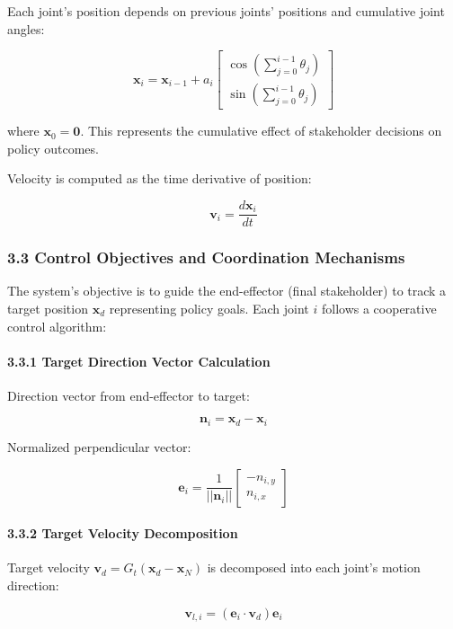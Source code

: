 Each joint's position depends on previous joints' positions and
cumulative joint angles:

\[\mathbf{x}_i = \mathbf{x}_{i-1} + a_i \begin{bmatrix} \cos(\sum_{j=0}^{i-1} \theta_j) \\ \sin(\sum_{j=0}^{i-1} \theta_j) \end{bmatrix}\]

where \(\mathbf{x}_0 = \mathbf{0}\). This represents the cumulative
effect of stakeholder decisions on policy outcomes.

Velocity is computed as the time derivative of position:

\[\mathbf{v}_i = \frac{d\mathbf{x}_i}{dt}\]

\subsubsection{3.3 Control Objectives and Coordination
Mechanisms}\label{control-objectives-and-coordination-mechanisms}

The system's objective is to guide the end-effector (final stakeholder)
to track a target position \(\mathbf{x}_d\) representing policy goals.
Each joint \(i\) follows a cooperative control algorithm:

\paragraph{3.3.1 Target Direction Vector
Calculation}\label{target-direction-vector-calculation}

Direction vector from end-effector to target:

\[\mathbf{n}_i = \mathbf{x}_d - \mathbf{x}_i\]

Normalized perpendicular vector:

\[\mathbf{e}_i = \frac{1}{||\mathbf{n}_i||} \begin{bmatrix} -n_{i,y} \\ n_{i,x} \end{bmatrix}\]

\paragraph{3.3.2 Target Velocity
Decomposition}\label{target-velocity-decomposition}

Target velocity \(\mathbf{v}_d = G_t(\mathbf{x}_d - \mathbf{x}_N)\) is
decomposed into each joint's motion direction:

\[\mathbf{v}_{l,i} = (\mathbf{e}_i \cdot \mathbf{v}_d) \mathbf{e}_i\]

